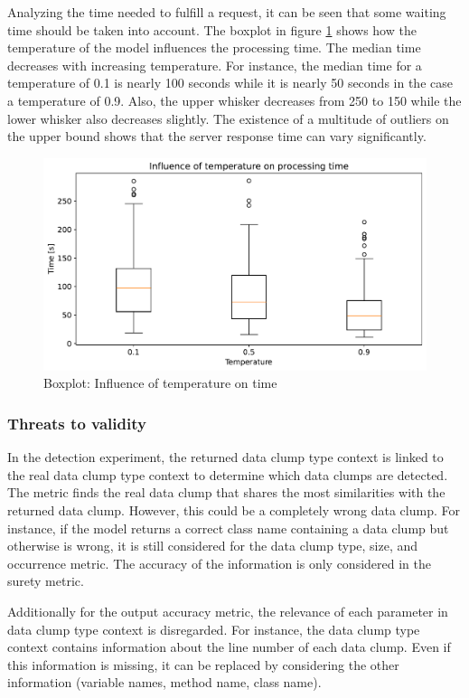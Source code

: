Analyzing the time needed to fulfill a request, it can be seen that some waiting time should be taken into account. The boxplot in figure \ref{fig:temperature_time} shows how the temperature of the model influences the processing time. The median time  decreases with increasing temperature. For instance, the median time for a temperature of 0.1 is nearly 100 seconds while it is nearly 50 seconds in the case a temperature of 0.9. Also, the upper whisker decreases from 250 to 150 while the lower whisker also decreases slightly. The existence of a multitude of outliers on the upper bound shows that the server response time can vary significantly. 

\begin{figure}
    \centering
    \includegraphics[width=\columnwidth]{figures/chapter5/detect_temperature_time.pdf}
    \caption{Boxplot: Influence of temperature on time}
    \label{fig:temperature_time}
\end{figure}

\subsubsection{Threats to validity}

In the detection experiment, the returned data clump type context is linked to the real data clump type context to determine which data clumps are detected. The metric finds the real data clump that shares the most similarities with the returned data clump. However, this could be a completely wrong data clump. For instance, if the model returns a correct class name containing a data clump but otherwise is wrong, it is still considered for the data clump type, size, and occurrence metric. The accuracy of the information is only considered in the surety metric.

Additionally for the output accuracy metric, the relevance of each parameter in data clump type context is disregarded. For instance, the data clump type context contains information about the line number of each data clump. Even if this information is missing, it can be replaced by considering the other information (variable names, method name, class name). 



